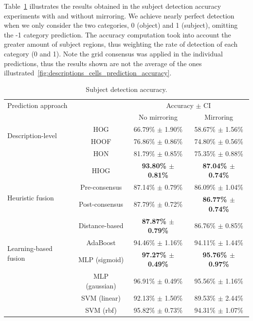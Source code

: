 \documentclass[10pt,twocolumn,letterpaper]{article}
\begin{document}
Table~\ref{tab:subject_detection_accuracy} illustrates the results obtained in the subject detection accuracy experiments with and without mirroring. We achieve nearly perfect detection when we only consider the two categories, 0 (object) and 1 (subject), omitting the -1 category prediction. The accuracy computation took into account the greater amount of subject regions, thus weighting the rate of detection of each category (0 and 1). Note the grid consensus was applied in the individual predictions, thus the results shown are not the average of the ones illustrated~\ref{fig:descriptions_cells_prediction_accuracy}.

\begin{table}[ht]
\caption{Subject detection accuracy.}
\begin{center}
\begin{tabular}{lccc}
    \hline
   Prediction approach & &  \multicolumn{2}{c}{Accuracy $\pm$ CI} \\
   \cline{3-4}
    & & No mirroring & Mirroring\\
    \hline
    \multirow{2}{*}{Description-level} & HOG & 66.79\% $\pm$ 1.90\% & 58.67\% $\pm$ 1.56\% \\
    & HOOF & 76.86\% $\pm$ 0.86\% & 74.80\% $\pm$ 0.56\% \\
    & HON & 81.79\% $\pm$ 0.85\% & 75.35\% $\pm$ 0.88\% \\
    & HIOG & \textbf{93.80\% $\pm$ 0.81\%} & \textbf{87.04\% $\pm$ 0.74\%} \\
    \hline
    \multirow{2}{*}{Heuristic fusion} & Pre-consensus & 87.14\% $\pm$ 0.79\% & 86.09\% $\pm$ 1.04\% \\
    & Post-consensus & 87.79\% $\pm$ 0.72\% & \textbf{86.77\% $\pm$ 0.74\%} \\
    & Distance-based & \textbf{87.87\% $\pm$ 0.79\%} & 86.76\% $\pm$ 0.85\% \\
    \hline
    \multirow{2}{*}{Learning-based fusion} & AdaBoost & 94.46\% $\pm$ 1.16\% & 94.11\% $\pm$ 1.44\% \\
    & MLP (sigmoid) & \textbf{97.27\% $\pm$ 0.49\%} & \textbf{95.76\% $\pm$ 0.97\%} \\
    & MLP (gaussian) & 96.91\% $\pm$ 0.49\% & 95.56\% $\pm$ 1.16\% \\
    & SVM (linear) & 92.13\% $\pm$ 1.50\% & 89.53\% $\pm$ 2.44\% \\
    & SVM (rbf) & 95.82\% $\pm$ 0.73\% & 94.31\% $\pm$ 1.07\%\\
    \hline
\end{tabular}
\end{center}
\label{tab:subject_detection_accuracy}
\end{table}
\end{document}
